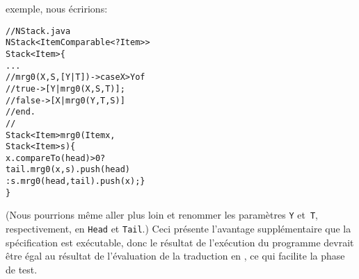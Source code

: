 exemple, nous écririons:
\begin{alltt}
// NStack.java
\public \class NStack<Item \extends Comparable<? \super Item>>
       \extends Stack<Item> \{
  ...
  // mrg0(X,S,[Y|T]) -> case X > Y of
  //                      true  -> [Y|mrg0(X,S,T)];
  //                      false -> [X|mrg0(Y,T,S)]
  //                    end.
  //
  \public Stack<Item> mrg0(\final Item x,
                          \final Stack<Item> s) \{
    \return x.compareTo(head) > 0 ?
           tail.mrg0(x,s).push(head)
         : s.mrg0(head,tail).push(x); \}
\}
\end{alltt}
(Nous pourrions même aller plus loin et renommer les paramètres
\Erlang \texttt{Y} et~\texttt{T}, respectivement, en \texttt{Head} et
\texttt{Tail}.) Ceci présente l'avantage supplémentaire que la
spécification est exécutable, donc le résultat de l'exécution du
programme \Erlang devrait être égal au résultat de l'évaluation de la
traduction en \Java, ce qui facilite la phase de test.

